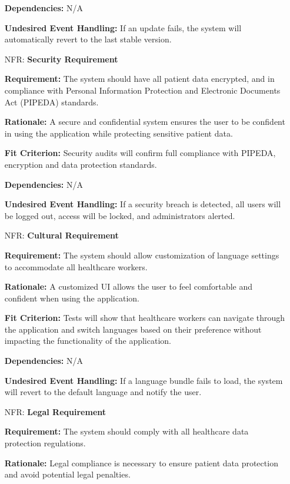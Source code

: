 \documentclass[12pt]{article}
\newcounter{nfrnum} %
\begin{document}
\begin{itemize}
    \textbf{Dependencies:} N/A

    \textbf{Undesired Event Handling:} If an update fails, the system will automatically revert to the last stable version.

\item[NFR\refstepcounter{nfrnum}\thenfrnum \label{NFR_Security}:] \textbf{Security Requirement}

    \textbf{Requirement:} The system should have all patient data encrypted, and in compliance with Personal Information Protection and Electronic Documents Act (PIPEDA) standards.

    \textbf{Rationale:} A secure and confidential system ensures the user to be confident in using the application while protecting sensitive patient data.

    \textbf{Fit Criterion:} Security audits will confirm full compliance with PIPEDA, encryption and data protection standards.  

    \textbf{Dependencies:} N/A

    \textbf{Undesired Event Handling:} If a security breach is detected, all users will be logged out, access will be locked, and administrators alerted.

\item[NFR\refstepcounter{nfrnum}\thenfrnum \label{NFR_Cultural}:] \textbf{Cultural Requirement}

    \textbf{Requirement:} The system should allow customization of language settings to accommodate all healthcare workers.

    \textbf{Rationale:} A customized UI allows the user to feel comfortable and confident when using the application.

    \textbf{Fit Criterion:} Tests will show that healthcare workers can navigate through the application and switch languages based on their preference without impacting the functionality of the application.

    \textbf{Dependencies:} N/A

    \textbf{Undesired Event Handling:} If a language bundle fails to load, the system will revert to the default language and notify the user.

\item[NFR\refstepcounter{nfrnum}\thenfrnum \label{NFR_Legal}:] \textbf{Legal Requirement}

    \textbf{Requirement:} The system should comply with all healthcare data protection regulations. 

    \textbf{Rationale:} Legal compliance is necessary to ensure patient data protection and avoid potential legal penalties.  


\end{itemize}
\end{document}
